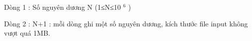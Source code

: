 Dòng 1 : Số nguyên dương N (1≤N≤10   $^    6   $   )  

   Dòng 2 : N+1 : mỗi dòng ghi một số nguyên dương, kích thước file input không vượt quá 1MB.